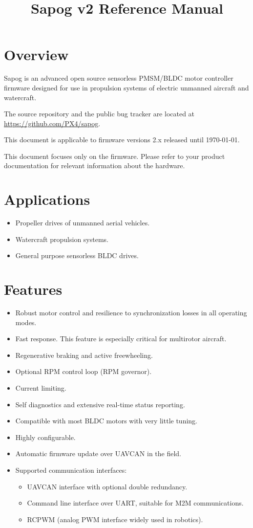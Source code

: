 \documentclass{zubaxdoc}
\title{Sapog v2 Reference Manual}
\begin{document}
\frontmatter

\begin{titlepage}
\section*{Overview}

Sapog is an advanced open source sensorless PMSM\slash{}BLDC motor controller firmware designed for
use in propulsion systems of electric unmanned aircraft and watercraft.

The source repository and the public bug tracker are located at
\url{https://github.com/PX4/sapog}.

This document is applicable to firmware versions 2.x released until \today.

This document focuses only on the firmware.
Please refer to your product documentation for relevant information about the hardware.

\section*{Applications}
\begin{itemize}
    \item Propeller drives of unmanned aerial vehicles.
    \item Watercraft propulsion systems.
    \item General purpose sensorless BLDC drives.
\end{itemize}

\BeginRightColumn
\section*{Features}
\begin{itemize}
    \item Robust motor control and resilience to synchronization losses in all operating modes.
    \item Fast response. This feature is especially critical for multirotor aircraft.
    \item Regenerative braking and active freewheeling.
    \item Optional RPM control loop (RPM governor).
    \item Current limiting.
    \item Self diagnostics and extensive real-time status reporting.
    \item Compatible with most BLDC motors with very little tuning.
    \item Highly configurable.
    \item Automatic firmware update over UAVCAN in the field.
    \item Supported communication interfaces:
    \begin{itemize}
        \item UAVCAN interface with optional double redundancy.
        \item Command line interface over UART, suitable for M2M communications.
        \item RCPWM (analog PWM interface widely used in robotics).
    \end{itemize}
\end{itemize}


\end{titlepage}
\end{document}
